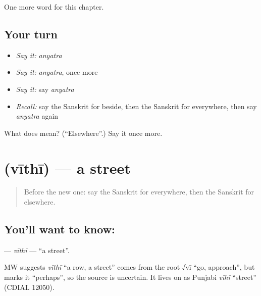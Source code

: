 \begin{grammarlens}[title={What you've built}]
One more word for this chapter.
\end{grammarlens}

\subsection*{Your turn}
\begin{itemize}
\raggedright
  \item \emph{Say it:} \emph{anyatra}
  \item \emph{Say it:} \emph{anyatra}, once more
  \item \emph{Say it:} say \emph{anyatra}
  \item \emph{Recall:} say the Sanskrit for beside, then the Sanskrit for everywhere, then say \emph{anyatra} again
\end{itemize}

\begin{tcolorbox}[breakable,colback=teal!4,colframe=teal!35!black,title={Before you move on}]
What does  mean? (\textquotedblleft{}Elsewhere\textquotedblright{}.) Say it once more.
\end{tcolorbox}
\section[\texorpdfstring{\sk{वीथी} (vīthī)}{वीथी (vīthī)}]{ (vīthī) — a street}

\label{lesson:SA-C95-vithi}



\begin{quote}
Before the new one: say the Sanskrit for everywhere, then the Sanskrit for elsewhere.
\end{quote}

\subsection*{You'll want to know: }
\textbf{} — \emph{vīthī} — \textquotedblleft{}a street\textquotedblright{}.

\begin{cousinweb}
MW suggests \emph{vīthī} \textquotedblleft{}a row, a street\textquotedblright{} comes from the root √vī \textquotedblleft{}go, approach\textquotedblright{}, but marks it \textquotedblleft{}perhaps\textquotedblright{}, so the source is uncertain. It lives on as Punjabi \emph{vīhī} \textquotedblleft{}street\textquotedblright{} (CDIAL 12050).
\end{cousinweb}

